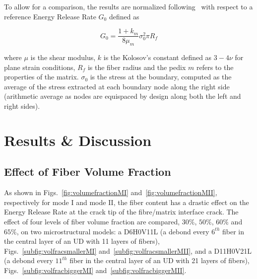 \documentclass[review]{elsarticle}
\begin{document}
To allow for a comparison, the results are normalized following~\cite{Sandino2016} with respect to a reference Energy Release Rate $G_{0}$ defined as

\begin{equation}
G_{0}=\frac{1+k_{m}}{8\mu_{m}}\sigma_{0}^{2}\pi R_{f}
\end{equation}

where $\mu$ is the shear modulus, $k$ is the Kolosov's constant defined as $3-4\nu$ for plane strain conditions, $R_{f}$ is the fiber radius and the pedix $m$ refers to the properties of the matrix. $\sigma_{0}$ is the stress at the boundary, computed as the average of the stress extracted at each boundary node along the right side (arithmetic average as nodes are equispaced by design along both the left and right sides).

\section{Results \& Discussion}

\subsection{Effect of Fiber Volume Fraction}\label{subsec:volfrac}

As shown in Figs.~\ref{fig:volumefractionMI} and~\ref{fig:volumefractionMII}, respectively for mode I and mode II, the fiber content has a drastic effect on the Energy Release Rate at the crack tip of the fibre/matrix interface crack. The effect of four levels of fiber volume fraction are compared, $30\%$, $50\%$, $60\%$ and $65\%$, on two microstructural models: a D6H0V11L (a debond every $6^{th}$ fiber in the central layer of an UD with 11 layers of fibers), Figs.~\ref{subfig:volfracsmallerMI} and~\ref{subfig:volfracsmallerMII}, and a D11H0V21L (a debond every $11^{th}$ fiber in the central layer of an UD with 21 layers of fibers), Figs.~\ref{subfig:volfracbiggerMI} and~\ref{subfig:volfracbiggerMII}. 
\end{document}
